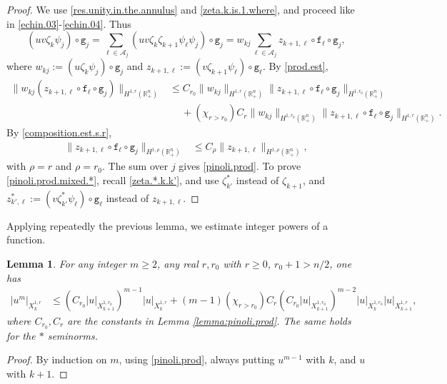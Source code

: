\documentclass[10pt,reqno,a4paper]{article}
\numberwithin{equation}{section}
\theoremstyle{plain}
\newtheorem{lemma}[theorem]{Lemma}
\theoremstyle{definition}
\newcommand{\R}{{\mathbb R}}
\newcommand{\mA}{\mathcal{A}}
\begin{document}
\begin{proof}
We use \eqref{res.unity.in.the.annulus} and \eqref{zeta.k.is.1.where}, 
and proceed like in \eqref{echin.03}-\eqref{echin.04}.  
Thus 
\[
(u v \zeta_k \psi_j) \circ \mathtt g_j 
= \sum_{\ell \in \mA_j} (u v \zeta_k \zeta_{k+1} \psi_\ell \psi_j) \circ \mathtt g_j 
= w_{kj} \sum_{\ell \in \mA_j} z_{k+1,\ell} \circ \mathtt f_\ell \circ \mathtt g_j, 
\]
where $w_{kj} := (u \zeta_k \psi_j) \circ \mathtt g_j$ %
and $z_{k+1,\ell} := (v \zeta_{k+1} \psi_\ell) \circ \mathtt g_\ell$. 
By \eqref{prod.est}, 
\begin{align*}
\| w_{kj} (z_{k+1,\ell} \circ \mathtt f_\ell \circ \mathtt g_j) \|_{H^{1,r}(\R^n_+)} 
& \leq 
C_{r_0} \| w_{kj} \|_{H^{1,r}(\R^n_+)} 
\| z_{k+1,\ell} \circ \mathtt f_\ell \circ \mathtt g_j \|_{H^{1,r_0}(\R^n_+)} 
\\ & \quad \ 
+ (\chi_{r > r_0}) C_{r} \| w_{kj} \|_{H^{1,r_0}(\R^n_+)} 
\| z_{k+1,\ell} \circ \mathtt f_\ell \circ \mathtt g_j \|_{H^{1,r}(\R^n_+)}.
\end{align*}
By \eqref{composition.est.s.r}, 
\begin{align*}
\| z_{k+1,\ell} \circ \mathtt f_\ell \circ \mathtt g_j \|_{H^{1,\rho}(\R^n_+)} 
& \leq C_\rho \| z_{k+1,\ell} \|_{H^{1,\rho}(\R^n_+)},
\end{align*}
with $\rho = r$ and $\rho = r_0$. The sum over $j$ gives \eqref{pinoli.prod}. 
To prove \eqref{pinoli.prod.mixed.*}, recall \eqref{zeta.*.k.k'}, 
and use $\zeta_{k'}^*$ instead of $\zeta_{k+1}$, 
and $z_{k',\ell}^* := (v \zeta^*_{k'} \psi_\ell) \circ \mathtt g_\ell$
instead of $z_{k+1,\ell}$.
\end{proof}

Applying repeatedly the previous lemma, we estimate integer powers of a function.


\begin{lemma} \label{lemma:pinoli.power}
For any integer $m \geq 2$, 
any real $r, r_0$ with $r \geq 0$, $r_0 + 1 > n/2$, one has 
\begin{align} \label{pinoli.power}
|u^m|_{X^{1,r}_k} 
& \leq ( C_{r_0} |u|_{X^{1,r_0}_{k+1}} )^{m-1} |u|_{X^{1,r}_k} 
+ (m-1) (\chi_{r>r_0}) C_r (C_{r_0} |u|_{X^{1,r_0}_{k+1}})^{m-2} |u|_{X^{1,r_0}_k} |u|_{X^{1,r}_{k+1}},
\end{align}
where $C_{r_0}, C_r$ are the constants in Lemma \ref{lemma:pinoli.prod}.
The same holds for the $*$ seminorms. 
\end{lemma}

\begin{proof} 
By induction on $m$, using \eqref{pinoli.prod},
always putting $u^{m-1}$ with $k$, and $u$ with $k+1$.
\end{proof}
\end{document}
